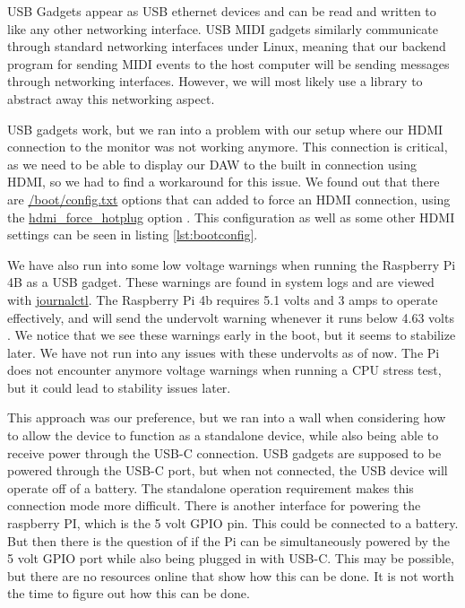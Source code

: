USB Gadgets appear as USB ethernet devices and can be read and written to like any other
networking interface. USB MIDI gadgets similarly communicate through standard networking
interfaces under Linux, meaning that our backend program for sending MIDI events to the
host computer will be sending messages through networking interfaces. However, we will
most likely use a library to abstract away this networking aspect.

USB gadgets work, but we ran into a problem with our setup where our HDMI connection to
the monitor was not working anymore. This connection is critical, as we need to be able to
display our DAW to the built in connection using HDMI, so we had to find a workaround for
this issue. We found out that there are \url{/boot/config.txt} options that can added to
force an HDMI connection, using the \url{hdmi_force_hotplug} option
\autocite{raspberryPiHDMIFix}. This configuration as well as some other HDMI settings can
be seen in listing \ref{lst:bootconfig}.

We have also run into some low voltage warnings when running the Raspberry Pi 4B as a USB
gadget. These warnings are found in system logs and are viewed with \url{journalctl}. The
Raspberry Pi 4b requires 5.1 volts and 3 amps to operate effectively, and will send the
undervolt warning whenever it runs below 4.63 volts \autocite{raspberryPiAmps}. We notice
that we see these warnings early in the boot, but it seems to stabilize later. We have not
run into any issues with these undervolts as of now. The Pi does not encounter anymore
voltage warnings when running a CPU stress test, but it could lead to stability issues
later.

This approach was our preference, but we ran into a wall when considering how to allow the
device to function as a standalone device, while also being able to receive power through
the USB-C connection. USB gadgets are supposed to be powered through the USB-C port, but
when not connected, the USB device will operate off of a battery. The standalone operation
requirement makes this connection mode more difficult. There is another interface for
powering the raspberry PI, which is the 5 volt GPIO pin. This could be connected to a
battery. But then there is the question of if the Pi can be simultaneously powered by the
5 volt GPIO port while also being plugged in with USB-C. This may be possible, but there
are no resources online that show how this can be done. It is not worth the time to figure
out how this can be done.

